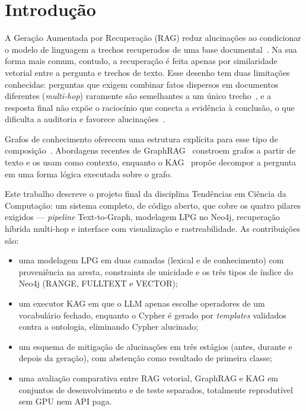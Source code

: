 \documentclass[12pt]{article}
\begin{document}
\section{Introdução}

A Geração Aumentada por Recuperação (RAG) reduz alucinações ao condicionar o modelo de linguagem a trechos recuperados de uma base documental~\cite{lewis2020rag}. Na sua forma mais comum, contudo, a recuperação é feita apenas por similaridade vetorial entre a pergunta e trechos de texto. Esse desenho tem duas limitações conhecidas: perguntas que exigem combinar fatos dispersos em documentos diferentes (\textit{multi-hop}) raramente são semelhantes a um único trecho~\cite{yang2018hotpotqa}, e a resposta final não expõe o raciocínio que conecta a evidência à conclusão, o que dificulta a auditoria e favorece alucinações~\cite{ji2023hallucination}.

Grafos de conhecimento oferecem uma estrutura explícita para esse tipo de composição~\cite{hogan2021kg,pan2024unifying}. Abordagens recentes de GraphRAG~\cite{edge2024graphrag,peng2024graphragsurvey} constroem grafos a partir de texto e os usam como contexto, enquanto o KAG~\cite{liang2024kag} propõe decompor a pergunta em uma forma lógica executada sobre o grafo.

Este trabalho descreve o projeto final da disciplina Tendências em Ciência da Computação: um sistema completo, de código aberto, que cobre os quatro pilares exigidos --- \textit{pipeline} Text-to-Graph, modelagem LPG no Neo4j, recuperação híbrida multi-hop e interface com visualização e rastreabilidade. As contribuições são:
\begin{itemize}
  \item uma modelagem LPG em duas camadas (lexical e de conhecimento) com proveniência na aresta, constraints de unicidade e os três tipos de índice do Neo4j (RANGE, FULLTEXT e VECTOR);
  \item um executor KAG em que o LLM apenas escolhe operadores de um vocabulário fechado, enquanto o Cypher é gerado por \textit{templates} validados contra a ontologia, eliminando Cypher alucinado;
  \item um esquema de mitigação de alucinações em três estágios (antes, durante e depois da geração), com abstenção como resultado de primeira classe;
  \item uma avaliação comparativa entre RAG vetorial, GraphRAG e KAG em conjuntos de desenvolvimento e de teste separados, totalmente reprodutível sem GPU nem API paga.
\end{itemize}
\end{document}
